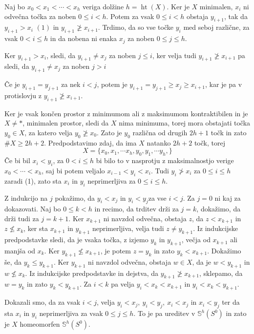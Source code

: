 \documentclass[mat1]{fmfdelo}
\DeclareMathOperator*{\htt}{ht}
\begin{document}
\begin{dokaz}
    Naj bo $x_0<x_1 <\cdots <x_h$ veriga dolžine $h=\htt(X)$. Ker je $X$
     minimalen, $x_i$ ni odvečna točka za noben $0\leq i <h$. Potem za 
     vsak $0\leq i <h$ obstaja $y_{i+1}$, tak da $y_{i+1}> x_i$ $(1)$ in $y_{i+1}
     \ngeq x_{i+1}$. Trdimo, da so vse točke $y_i$ med seboj različne, za vsak
      $0< i \leq h$ in da nobena ni enaka $x_j$ za noben $0\leq j \leq h$.

      Ker $y_{i+1} > x_i$, sledi, da $y_{i+1}\neq x_j$ za noben $j\leq i$, 
      ker velja tudi $y_{i+1}\ngeq x_{i+1}$ pa sledi, da $y_{i+1}\neq x_j$ za 
      noben $j> i$

      Če je $y_{i+1}= y_{j+1}$ za nek $i<j$, potem je $y_{i+1}= y_{j+1}\geq
       x_j \geq x_{i+1}$, kar je pa v protislovju z $y_{i+1} 
       \ngeq x_{i+1}$.

       Ker je vsak končen prostor z minimumom ali z maksimumom kontraktibilen 
       in je $X\neq \ast$, minimalen prostor, sledi da $X$ nima minimuma, 
       torej mora obstajati točka $y_0\in X$, za katero velja $y_0 \ngeq x_0$.
        Zato je $y_0$ različna od drugih $2h+1$ točk in zato $\# X\geq 2h+2$.
        Predpodstavimo zdaj, da ima $X$ natanko $2h+2$ točk, torej 
        $$
        X=\{x_0,x_1,\cdots x_h,y_0,y_1,\cdots y_h,\}
        $$
        Če bi bil $x_i < y_i$, za $0<i\leq h$ bi bilo to v nasprotju z 
        maksimalnostjo verige $x_0 <\cdots <x_h$, saj bi potem veljalo $x_{i-1} 
        < y_i < x_i$. Tudi $y_i \ngtr x_i$ za $0\leq i \leq h$ zaradi (1), zato sta $x_i $ in $y_i$ neprimerljiva za $0\leq i \leq h$.

        Z indukcijo na $j$ pokažimo, da $y_i < x_j$ in $y_i < y_j$za vse $i<j$. Za $j=0$ 
        ni kaj za dokazovati. Naj bo $0\leq k <h$ in recimo, da trditev drži za $j=k$, 
        dokažimo, da drži tudi za $j=k+1$. Ker $x_{k+1}$ ni navzdol odvečna, 
        obstaja $z$, da $z< x_{k+1}$ in $z\nleq x_k$, ker sta $x_{k+1}$ in 
        $y_{k+1}$ neprimerljiva, velja tudi $z\neq y_{k+1}$. Iz indukcijske 
        predpodstavke sledi, da je vsaka točka, z izjemo $y_k$ in $y_{k+1}$, večja 
        od $x_{k+1}$ ali manjša od $x_k$. Ker $y_{k+1} \nleq x_{k+1}$, je potem
        $z=y_k$ in zato $y_k<x_{k+1}$. Dokažimo še, da $y_k\leq y_{k+1}$. Ker 
        $y_{k+1}$ ni navzdol odvečna, obstaja $w\in X$, da je $w<y_{k+1}$ in 
        $w\nleq x_k$. Iz indukcijske predpodstavke
         in dejstva, da $y_{k+1}\ngeq x_{k+1}$, sklepamo,
        da $w=y_k$ in zato $y_k<y_{k+1}$. Za $i<k$ pa velja $y_i<x_k<x_{k+1}$ in
        $y_i<x_k<y_{k+1}$.

        Dokazali smo, da za vsak $i<j$,  velja $y_i < x_j,\ y_i < y_j,\ x_i < x_j$ in
        $x_i < y_j$ ter da sta $x_i$ in $y_i$ neprimerljiva za vsak $0\leq j \leq h$.
        To je pa ureditev v $\mathds{S}^h(S^0)$ in zato je $X$ homeomorfen 
        $\mathds{S}^h(S^0)$.

\end{dokaz}
\end{document}
